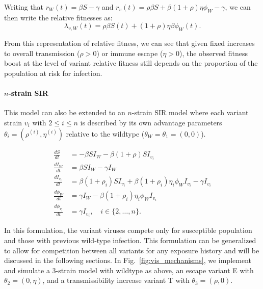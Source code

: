 \documentclass[11pt,oneside,letterpaper]{article}
\newcommand{\wt}{W}
\newcommand{\varEscape}{\eta}
\newcommand{\varTransmission}{\rho}
\begin{document}
Writing that $r_{\wt}(t) = \beta S - \gamma$ and $r_{v}(t) = \varTransmission \beta  S + \beta (1+\varTransmission) \varEscape \phi_{\wt} - \gamma$, we can then write the relative fitnesses as:
\begin{equation} \label{eq:two_strain_relative_fitness}
\lambda_{v,\wt}(t) = \varTransmission\beta S(t) + (1+\varTransmission) \varEscape \beta \phi_{\wt}(t).
\end{equation}

From this representation of relative fitness, we can see that given fixed increases to overall transmission ($\varTransmission > 0$) or immune escape ($\varEscape > 0$), the observed fitness boost at the level of variant relative fitness still depends on the proportion of the population at risk for infection.

\paragraph{$n$-strain SIR}%

This model can also be extended to an $n$-strain SIR model where each variant strain $v_i$ with $2\leq i \leq n$ is described by its own advantage parameters $\theta_{i} = (\varTransmission^{(i)}, \varEscape ^{(i)})$  relative to the wildtype ($\theta_{\wt} = \theta_{1} = (0, 0)$).

\begin{align*}
    \frac{d S}{d t} &= - \beta S I_{\wt} - \beta (1+\varTransmission) S I_{v_{i}}\\
    \frac{d I_{\wt}}{dt} &= \beta S I_{\wt} - \gamma I_{\wt}\\
    \frac{d I_{v_{i}}}{dt} &= \beta (1+\varTransmission_i) S I_{v_{i}} + \beta (1+\varTransmission_i) \varEscape_i \phi_{\wt} I_{v_{i}} - \gamma I_{v_{i}}\\
    \frac{d \phi_{\wt}}{dt} &= \gamma I_{\wt} - \beta (1+\varTransmission_i) \varEscape_i \phi_{\wt} I_{v_{i}}\\
    \frac{d \phi_{v_{i}}}{dt} &= \gamma I_{v_{i}}, \quad i \in \{2, \ldots, n\}.
\end{align*}

In this formulation, the variant viruses compete only for susceptible population and those with previous wild-type infection.
This formulation can be generalized to allow for competition between all variants for any exposure history and will be discussed in the following sections.
In Fig.~\ref{fig:vis_mechanisms}, we implement and simulate a 3-strain model with wildtype as above, an escape variant E with $\theta_{2} = (0, \varEscape)$, and a transmissibility increase variant T with $\theta_{3} = (\varTransmission, 0)$.
\end{document}
